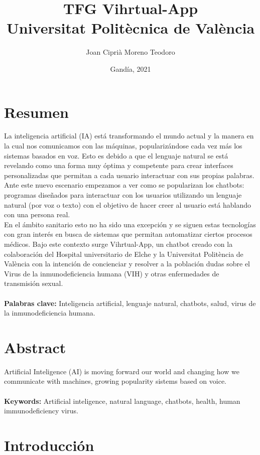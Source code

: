 \documentclass[11pt]{book}
\title{
{TFG Vihrtual-App}\\
{\large Universitat Politècnica de València}\\
}
\author{Joan Ciprià Moreno Teodoro}
\date{Gandía, 2021}
\begin{document}
\maketitle

\chapter*{Resumen}
La inteligencia artificial (IA) está transformando el mundo actual y la manera en la cual nos comunicamos con las máquinas, popularizándose cada vez más los sistemas basados en voz. Esto es debido a que el lenguaje natural se está revelando como una forma muy óptima y competente para crear interfaces personalizadas que permitan a cada usuario interactuar con sus propias palabras. Ante este nuevo escenario empezamos a ver como se popularizan los chatbots: programas diseñados para interactuar con los usuarios utilizando un lenguaje natural (por voz o texto) con el objetivo de hacer creer al usuario está hablando con una persona real. \\

En el ámbito sanitario esto no ha sido una excepción y se siguen estas tecnologías con gran interés en busca de sistemas que permitan automatizar ciertos procesos médicos.
Bajo este contexto surge Vihrtual-App, un chatbot creado con la colaboración del Hospital universitario de Elche y la Universitat Politència de València con la intención de concienciar y resolver a la población dudas sobre el Virus de la inmunodeficiencia humana (VIH) y otras enfermedades de transmisión sexual.
\\
\\
\textbf{Palabras clave:} Inteligencia artificial, lenguaje natural, chatbots, salud, virus de la inmunodeficiencia humana.

\chapter*{Abstract}
Artificial Inteligence (AI) is moving forward our world and changing how we   communicate with machines, growing popularity sistems based on voice.
\\
\\
\textbf{Keywords:} Artificial inteligence, natural language, chatbots, health, human immunodeficiency virus. 

\tableofcontents

\chapter{Introducción}

\end{document}
